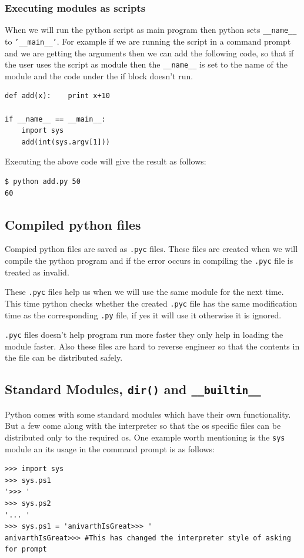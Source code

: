 \documentclass[12pt,a4paper]{article}
\begin{document}
\subsubsection{Executing modules as scripts}
When we will run the python script as main program then python sets \texttt{\_\_name\_\_} to \texttt{'\_\_main\_\_'}. For example if we are running the script in a command prompt and we are getting the arguments then we can add the following code, so that if the user uses the script as module then the \texttt{\_\_name\_\_} is set to the name of the module and the code under the if block doesn't run.
\begin{verbatim}
def add(x):    print x+10

if __name__ == __main__:
    import sys
    add(int(sys.argv[1]))
\end{verbatim}  

Executing the above code will give the result as follows:
\begin{verbatim}
$ python add.py 50
60
\end{verbatim}


\subsection{Compiled python files}
Compied python files are saved as \texttt{.pyc} files. These files are created when we will compile the python program and if the error occurs in compiling the \texttt{.pyc} file is treated as invalid. 

These \texttt{.pyc} files help us when we will use the same module for the next time. This time python checks whether the created \texttt{.pyc} file has the same modification time as the corresponding \texttt{.py} file, if yes it will use it otherwise it is ignored. 

\texttt{.pyc} files doesn't help program run more faster they only help in loading the module faster. Also these files are hard to reverse engineer so that the contents in the file can be distributed safely.

\subsection{Standard Modules, \texttt{dir()} and \texttt{\_\_builtin\_\_}}
Python comes with some standard modules which have their own functionality. But a few come along with the interpreter so that the os specific files can be distributed only to the required os. One example worth mentioning is the \texttt{sys} module an its usage in the command prompt is as follows:
\begin{verbatim}
>>> import sys
>>> sys.ps1
'>>> '
>>> sys.ps2
'... '
>>> sys.ps1 = 'anivarthIsGreat>>> '
anivarthIsGreat>>> #This has changed the interpreter style of asking for prompt
\end{verbatim}
\end{document}
